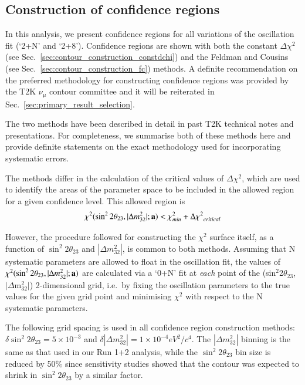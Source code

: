 \subsection {Construction of confidence regions}
\label{sec:contour_construction}

In this analysis, we present confidence regions for all variations of the oscillation fit (`2+N' and `2+8').
Confidence regions are shown with both 
the constant $\Delta\chi^{2}$ (see Sec.\ \ref{sec:contour_construction_constdchi})
and the Feldman and Cousins (see Sec.\ \ref{sec:contour_construction_fc}) methods.
A definite recommendation on the preferred methodology for constructing confidence regions was provided by
the T2K $\nu_{\mu}$ contour committee \cite{T2KNuMuContourCom} and it will be reiterated in Sec.\ \ref{sec:primary_result_selection}.

The two methods have been described in detail in past T2K technical notes and presentations.
For completeness, we summarise both of these methods here
and provide definite statements on the exact methodology used for incorporating systematic errors.

The methods differ in the calculation of the critical values of $\Delta{\chi^{2}}$, which are used to identify the areas 
of the parameter space to be included in the allowed region for a given confidence level. This allowed region is
\begin{equation}
\displaystyle
\chi^{2}(\sin^{2}2\theta_{23},|\Delta m^{2}_{32}|; {\bf a}) < \chi_{min}^{2} + \Delta{\chi^{2}}_{critical}
\label{eq:chiconfregion}
\end{equation}

However, the procedure followed for constructing the $\chi^{2}$ surface itself,
as a function of $\sin^{2}2\theta_{23}$ and $|\Delta m^{2}_{32}|$, is common to both methods.
Assuming that N systematic parameters are allowed to float in the oscillation fit,
the values of $\chi^{2}(\sin^{2}2\theta_{23},|\Delta m^{2}_{32}|; {\bf a})$ 
are calculated via a `0+N' fit at {\em each} point of the (sin$^{2}$2$\theta_{23}$, $|\Delta$m$^{2}_{32}|$) 
2-dimensional grid, i.e.\ by fixing the oscillation parameters to the true values for the given grid point 
and minimising $\chi^{2}$ with respect to the N systematic parameters.

The following grid spacing is used in all confidence region construction methods:
$\delta{\sin^{2}2\theta_{23}}=5\times10^{-3}$ and
$\delta{|\Delta{m^{2}_{32}}|}=1\times10^{-4} eV^{2}/c^{4}$.
The $|\Delta{m^{2}_{32}}|$ binning is the same as that used in our Run 1+2 analysis,
while the $\sin^{2}2\theta_{23}$ bin size is reduced by 50\% since sensitivity studies showed
that the contour was expected to shrink in $\sin^{2}2\theta_{23}$ by a similar factor.


